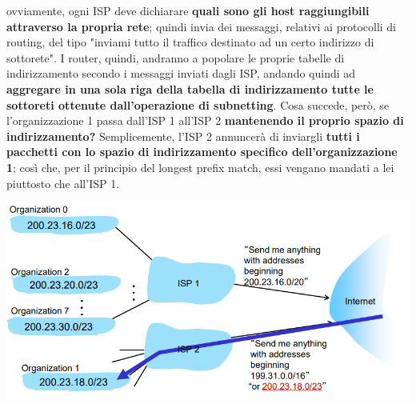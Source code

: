 \documentclass[12pt]{article}
\begin{document}
ovviamente, ogni ISP deve dichiarare \textbf{quali sono gli host raggiungibili attraverso la propria rete}; quindi invia dei messaggi, relativi ai protocolli di routing, del tipo "inviami tutto il traffico destinato ad un certo indirizzo di sottorete".
I router, quindi, andranno a popolare le proprie tabelle di indirizzamento secondo i messaggi inviati dagli ISP, andando quindi ad \textbf{aggregare in una sola riga della tabella di indirizzamento tutte le sottoreti ottenute dall'operazione di subnetting}.
Cosa succede, però, se l'organizzazione 1 passa dall'ISP 1 all'ISP 2 \textbf{mantenendo il proprio spazio di indirizzamento?} 
Semplicemente, l'ISP 2 annuncerà di inviargli \textbf{tutti i pacchetti con lo spazio di indirizzamento specifico dell'organizzazione 1}; così che, per il principio del longest prefix match,  essi vengano mandati a lei piuttosto che all'ISP 1.
\begin{center}
    \includegraphics[width =0.80\linewidth]{Images/93.png}
\end{center}
\end{document}
